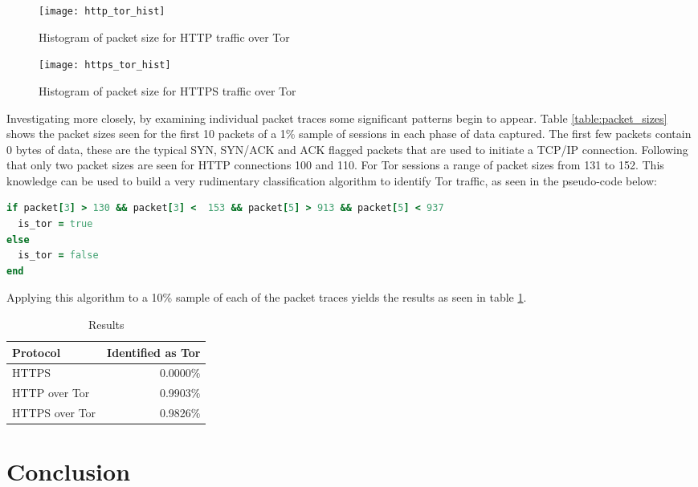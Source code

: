 \documentclass[conference]{IEEEtran}
\begin{document}
\begin{figure}[H]
  \centering\texttt{[image: http\_tor\_hist]}
  \caption{Histogram of packet size for HTTP traffic over Tor}
  \label{http_tor_hist}
\end{figure}

\begin{figure}[H]
  \centering\texttt{[image: https\_tor\_hist]}
  \caption{Histogram of packet size for HTTPS traffic over Tor}
  \label{https_tor_hist}
\end{figure}

Investigating more closely, by examining individual packet traces some
significant patterns begin to appear. Table \ref{table:packet_sizes} shows the
packet sizes seen for the first 10 packets of a 1\% sample of sessions in each
phase of data captured. The first few packets contain 0 bytes of data, these
are the typical SYN, SYN/ACK and ACK flagged packets that are used to initiate
a TCP/IP connection. Following that only two packet sizes are seen for HTTP
connections 100 and 110. For Tor sessions a range of packet sizes from 131 to
152. This knowledge can be used to build a very rudimentary classification
algorithm to identify Tor traffic, as seen in the pseudo-code below:



\begin{lstlisting}[language=ruby]
if packet[3] > 130 && packet[3] <  153 && packet[5] > 913 && packet[5] < 937
  is_tor = true
else
  is_tor = false
end
\end{lstlisting}

Applying this algorithm to a 10\% sample of each of the packet traces yields
the results as seen in table \ref{table:heuristic-results}.

\begin{table}[H]
  \begin{tabular*}{\linewidth}{lr}
    \toprule
    Protocol & Identified as Tor\\
    \midrule
    HTTPS & 0.0000\% \\
    HTTP over Tor & 0.9903\% \\
    HTTPS over Tor & 0.9826\% \\
    \bottomrule
  \end{tabular*}
  \caption{Results}
  \label{table:heuristic-results}
\end{table}

\section{Conclusion}
\end{document}
